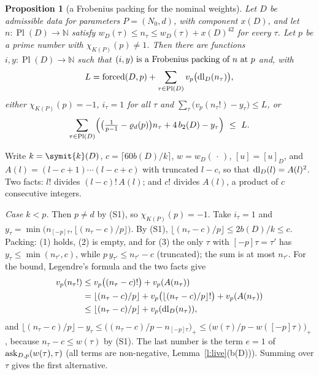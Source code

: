 \documentclass[11pt,a4paper]{article}
\makeatletter
\theoremstyle{plainx}
\newtheorem{proposition}[theorem]{Proposition}
\theoremstyle{uprightx}
\renewenvironment{proof}[1][Proof]{\par\pushQED{\qed}\normalfont\topsep0pt\partopsep0pt
  \trivlist\item[\hskip\labelsep\itshape #1.]\ignorespaces}{\popQED\endtrivlist\@endpefalse}
\newcommand{\NN}{\mathbb{N}}
\newcommand{\KP}[1]{K(#1)}
\newcommand{\chiK}[1]{\chi_{\KP{#1}}}
\newcommand{\nsw}[2]{\varrho_{#1}(#2)}
\newcommand{\PlD}[1]{\operatorname{Pl}(#1)}
\newcommand{\kD}[1]{\symit{k}(#1)}
\newcommand{\xD}[1]{x(#1)}
\newcommand{\bD}[1]{b(#1)}
\newcommand{\nomW}[2]{w_{#1}(#2)}
\newcommand{\pinD}[2]{[#2]_{#1}}
\newcommand{\btwo}[1]{b_2(#1)}
\makeatother
\begin{document}
\begin{proposition}[a Frobenius packing for the nominal weights]\label{p:packing}
Let $D$ be admissible data for parameters $P=(N_0,d)$, with component $\xD{D}$, and let $n\colon\PlD{D}\to\NN$ satisfy
$\nomW{D}{\tau}\le n_\tau\le\nomW{D}{\tau}+\xD{D}^{42}$ for every $\tau$. Let $p$ be a prime number with $\chiK{P}(p)\ne1$.
Then there are functions $i,y\colon\PlD{D}\to\NN$ such that $\packing{p}{n}{i}{y}$ and, with
\[L=\forced{D}{p}+\sum_{\tau\in\PlD{D}}v_p\bigl(\dl{D}{n_\tau}\bigr) ,\]
either $\chiK{P}(p)=-1$, $i_\tau=1$ for all $\tau$ and $\sum_\tau\bigl(v_p(n_\tau!)-y_\tau\bigr)\le L$, or
\[\sum_{\tau\in\PlD{D}}\Bigl(\bigl(\tfrac1{p-1}-\nsw{d}{p}\bigr)n_\tau+4\,\btwo{D}-y_\tau\Bigr)\ \le\ L .\]
\end{proposition}
\begin{proof}
Write $k=\kD{D}$, $c=\lceil60\bD{D}/k\rceil$, $w=\nomW{D}{\,\cdot\,}$, $[u]=\pinD{D}{u}$, and $A(l)=(l-c+1)\cdots(l-c+c)$
with truncated $l-c$, so that $\dl{D}{l}=A(l)^2$. Two facts: $l!$ divides $(l-c)!\,A(l)$; and $c!$ divides $A(l)$,
a product of $c$ consecutive integers.

\emph{Case $k<p$.} Then $p\ne d$ by (S1), so $\chiK{P}(p)=-1$. Take $i_\tau=1$ and
$y_\tau=\min\bigl(n_{[-p]\tau},\lfloor(n_\tau-c)/p\rfloor\bigr)$. By (S1), $\lfloor(n_\tau-c)/p\rfloor\le2\bD{D}/k\le c$.
Packing: (1) holds, (2) is empty, and for (3) the only $\tau$ with $[-p]\tau=\tau'$ has
$y_\tau\le\min(n_{\tau'},c)$, while $p\,y_{\tau'}\le n_{\tau'}-c$ (truncated); the sum is at most $n_{\tau'}$. For the bound,
Legendre's formula and the two facts give
\begin{align*}
v_p(n_\tau!)&\le v_p\bigl((n_\tau-c)!\bigr)+v_p(A(n_\tau))\\
&=\lfloor(n_\tau-c)/p\rfloor+v_p\bigl(\lfloor(n_\tau-c)/p\rfloor!\bigr)+v_p(A(n_\tau))\\
&\le\lfloor(n_\tau-c)/p\rfloor+v_p(\dl{D}{n_\tau}) ,
\end{align*}
and $\lfloor(n_\tau-c)/p\rfloor-y_\tau\le\bigl((n_\tau-c)/p-n_{[-p]\tau}\bigr)_+\le\bigl(w(\tau)/p-w([-p]\tau)\bigr)_+$,
because $n_\tau-c\le w(\tau)$ by (S1). The last number is the term $e=1$ of $\ask{D}{p}{w(\tau)}{\tau}$ (all terms are
non-negative, Lemma~\ref{l:live}(\bD{D})). Summing over $\tau$ gives the first alternative.


\end{proof}
\end{document}
